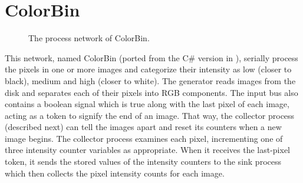 \section{ColorBin}
\label{sec:colorbin}
\begin{figure}%
  \centering
  \caption{The process network of ColorBin.}
  \label{net:colorbin}
\end{figure}


This network, named ColorBin (ported from the C\# version in
\cite{skovhede2017c++}), serially process the pixels in one or more images and
categorize their intensity as low (closer to black), medium and high (closer to
white). The generator reads images from the disk and separates each of their
pixels into RGB components. The input bus also contains a boolean signal which
is true along with the last pixel of each image, acting as a token to signify
the end of an image. That way, the collector process (described next) can tell
the images apart and reset its counters when a new image begins. The collector
process examines each pixel, incrementing one of three intensity counter
variables as appropriate. When it receives the last-pixel token, it sends the
stored values of the intensity counters to the sink process which then collects
the pixel intensity counts for each image.

